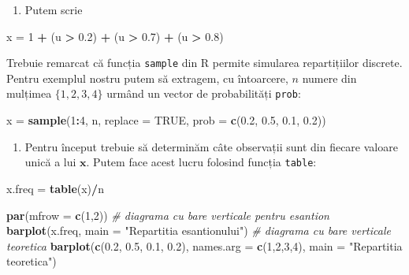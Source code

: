 \documentclass[]{article}
\newenvironment{Shaded}{\begin{snugshade}}{\end{snugshade}}
\newcommand{\CommentTok}[1]{\textcolor[rgb]{0.56,0.35,0.01}{\textit{#1}}}
\newcommand{\DataTypeTok}[1]{\textcolor[rgb]{0.13,0.29,0.53}{#1}}
\newcommand{\DecValTok}[1]{\textcolor[rgb]{0.00,0.00,0.81}{#1}}
\newcommand{\FloatTok}[1]{\textcolor[rgb]{0.00,0.00,0.81}{#1}}
\newcommand{\KeywordTok}[1]{\textcolor[rgb]{0.13,0.29,0.53}{\textbf{#1}}}
\newcommand{\NormalTok}[1]{#1}
\newcommand{\OperatorTok}[1]{\textcolor[rgb]{0.81,0.36,0.00}{\textbf{#1}}}
\newcommand{\OtherTok}[1]{\textcolor[rgb]{0.56,0.35,0.01}{#1}}
\newcommand{\StringTok}[1]{\textcolor[rgb]{0.31,0.60,0.02}{#1}}
\providecommand{\tightlist}{%
  \setlength{\itemsep}{0pt}\setlength{\parskip}{0pt}}
\begin{document}
\begin{enumerate}
\def\labelenumi{\arabic{enumi}.}
\setcounter{enumi}{1}
\tightlist
\item
  Putem scrie
\end{enumerate}

\begin{Shaded}
\begin{Highlighting}[]
\NormalTok{x =}\StringTok{ }\DecValTok{1} \OperatorTok{+}\StringTok{ }\NormalTok{(u }\OperatorTok{>}\StringTok{ }\FloatTok{0.2}\NormalTok{) }\OperatorTok{+}\StringTok{ }\NormalTok{(u }\OperatorTok{>}\StringTok{ }\FloatTok{0.7}\NormalTok{) }\OperatorTok{+}\StringTok{ }\NormalTok{(u }\OperatorTok{>}\StringTok{ }\FloatTok{0.8}\NormalTok{)}
\end{Highlighting}
\end{Shaded}

Trebuie remarcat că funcția \texttt{sample} din R permite simularea
repartițiilor discrete. Pentru exemplul nostru putem să extragem, cu
întoarcere, \(n\) numere din mulțimea \(\{1,2,3,4\}\) urmând un vector
de probabilități \texttt{prob}:

\begin{Shaded}
\begin{Highlighting}[]
\NormalTok{x =}\StringTok{ }\KeywordTok{sample}\NormalTok{(}\DecValTok{1}\OperatorTok{:}\DecValTok{4}\NormalTok{, n, }\DataTypeTok{replace =} \OtherTok{TRUE}\NormalTok{, }
           \DataTypeTok{prob =} \KeywordTok{c}\NormalTok{(}\FloatTok{0.2}\NormalTok{, }\FloatTok{0.5}\NormalTok{, }\FloatTok{0.1}\NormalTok{, }\FloatTok{0.2}\NormalTok{))}
\end{Highlighting}
\end{Shaded}

\begin{enumerate}
\def\labelenumi{\arabic{enumi}.}
\setcounter{enumi}{2}
\tightlist
\item
  Pentru început trebuie să determinăm câte observații sunt din fiecare
  valoare unică a lui \(\boldsymbol x\). Putem face acest lucru folosind
  funcția \texttt{table}:
\end{enumerate}

\begin{Shaded}
\begin{Highlighting}[]
\NormalTok{x.freq =}\StringTok{ }\KeywordTok{table}\NormalTok{(x)}\OperatorTok{/}\NormalTok{n}

\KeywordTok{par}\NormalTok{(}\DataTypeTok{mfrow =} \KeywordTok{c}\NormalTok{(}\DecValTok{1}\NormalTok{,}\DecValTok{2}\NormalTok{))}
\CommentTok{# diagrama cu bare verticale pentru esantion}
\KeywordTok{barplot}\NormalTok{(x.freq, }\DataTypeTok{main =} \StringTok{"Repartitia esantionului"}\NormalTok{)}
\CommentTok{# diagrama cu bare verticale teoretica}
\KeywordTok{barplot}\NormalTok{(}\KeywordTok{c}\NormalTok{(}\FloatTok{0.2}\NormalTok{, }\FloatTok{0.5}\NormalTok{, }\FloatTok{0.1}\NormalTok{, }\FloatTok{0.2}\NormalTok{), }\DataTypeTok{names.arg =} \KeywordTok{c}\NormalTok{(}\DecValTok{1}\NormalTok{,}\DecValTok{2}\NormalTok{,}\DecValTok{3}\NormalTok{,}\DecValTok{4}\NormalTok{),}
        \DataTypeTok{main =} \StringTok{"Repartitia teoretica"}\NormalTok{)}
\end{Highlighting}
\end{Shaded}
\end{document}
